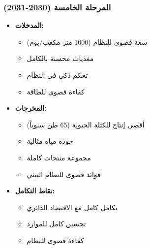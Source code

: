 \subsubsection{المرحلة الخامسة (2030-2031)}
\begin{itemize}
    \item \textbf{المدخلات:}
    \begin{itemize}
        \item سعة قصوى للنظام (1000 متر مكعب/يوم)
        \item مغذيات محسنة بالكامل
        \item تحكم ذكي في النظام
        \item كفاءة قصوى للطاقة
    \end{itemize}
    \item \textbf{المخرجات:}
    \begin{itemize}
        \item أقصى إنتاج للكتلة الحيوية (65 طن سنوياً)
        \item جودة مياه مثالية
        \item مجموعة منتجات كاملة
        \item فوائد قصوى للنظام البيئي
    \end{itemize}
    \item \textbf{نقاط التكامل:}
    \begin{itemize}
        \item تكامل كامل مع الاقتصاد الدائري
        \item تحسين كامل للموارد
        \item كفاءة قصوى للنظام
    \end{itemize}
\end{itemize}

